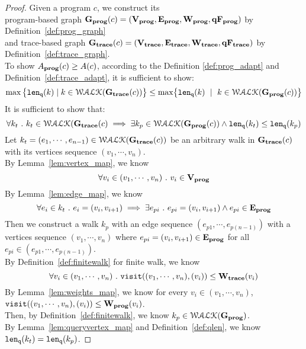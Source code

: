 \begin{proof}
Given a program ${c}$, 
we construct its 
\\
program-based graph $\mathtt{\bf{G_{prog}}}({c}) = (\mathtt{\bf{V_{prog}}}, \mathtt{\bf{E_{prog}}}, \mathtt{\bf{W_{prog}}}, \mathtt{\bf{qF_{prog}}})$
by Definition~\ref{def:prog_graph}
\\ and 
trace-based graph $\mathtt{\bf{G_{trace}}}({c}) = (\mathtt{\bf{V_{trace}}}, \mathtt{\bf{E_{trace}}}, \mathtt{\bf{W_{trace}}}, \mathtt{\bf{qF_{trace}}})$  by Definition~\ref{def:trace_graph}.
\\
To show $A_{\bf{prog}}({c}) \geq A({c})$, according to the Definition \ref{def:prog_adapt} and Definition~\ref{def:trace_adapt}, it is sufficient to show:
%
$$
\max \big 
\{ \qlen(k) \mid k \in \walks(\traceG(c)) \big \} 
\leq
\max\left\{ \qlen(k) \ \mid \  k\in \walks(\progG({c}))\right \}
$$
%
%
It is sufficient to show that:
\[
  \forall k_t ~.~ 
  k_t \in \mathcal{WALK}(\mathtt{\bf{G_{trace}}}({c}) \implies
  \exists k_p \in \mathcal{WALK}(\mathtt{\bf{G_{prog}}}({c})) \land 
  \mathtt{len}_{\tt q}(k_t) \leq \mathtt{len}_{\tt q}(k_p)
\]
%
Let $k_t = (e_1, \cdots, e_{n-1}) \in \mathcal{WALK}(\mathtt{\bf{G_{trace}}}(c))$ be an arbitrary walk in $\mathtt{\bf{G_{trace}}}(c)$ with its vertices sequence 
$(v_1, \cdots, v_n)$.
\\
By Lemma~\ref{lem:vertex_map},
we know 
\[
  \forall v_i \in (v_1, \cdots, v_n) ~.~ v_i \in \mathtt{\bf{V_{prog}}}
  \]
%
By Lemma~\ref{lem:edge_map}, we know
%
\[
  \forall e_i \in k_t ~.~ e_i = (v_i, v_{i + 1}) \implies
  \exists e_{pi} ~.~ e_{pi} = (v_i, v_{i + 1}) \land e_{pi} \in \mathtt{\bf{E_{prog}}}
  \]
Then we construct a walk $k_p$ with an edge sequence $(e_{p1}, \cdots, e_{p(n-1)}) $ 
with a vertices sequence $(v_1, \cdots, v_n)$ where 
$e_{pi} = (v_i, v_{i + 1}) \in \mathtt{\bf{E_{prog}}}$ for all $e_{pi} \in (e_{p1}, \cdots, e_{p(n-1)})$.
\\
By Definition~\ref{def:finitewalk} for finite walk, 
we know
\[
  \forall v_i \in (v_1, \cdots, v_n) ~.~
  \mathtt{visit}((v_1, \cdots, v_n), (v_i)) \leq \mathtt{\bf{W_{trace}}}(v_i)
\]
%
By Lemma~\ref{lem:weights_map}, we know for every $ v_i \in (v_1, \cdots, v_n)$,
$\mathtt{visit}((v_1, \cdots, v_n), (v_i)) \leq \mathtt{\bf{W_{prog}}}(v_i)$.
\\
Then, by Definition~\ref{def:finitewalk}, we know $k_p \in \mathcal{WALK}(\mathtt{\bf{G_{prog}}})$.
\\
By Lemma~\ref{lem:queryvertex_map} and Definition~\ref{def:qlen}, we know $\mathtt{len}_{\tt q}(k_t) = \mathtt{len}_{\tt q}(k_p)$.

\end{proof}
